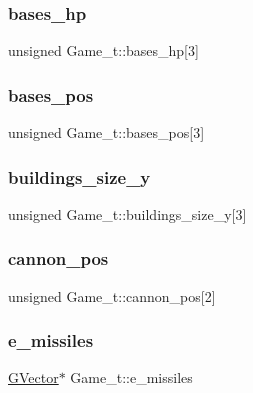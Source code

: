 \subsubsection{\texorpdfstring{bases\+\_\+hp}{bases\_hp}}
{\footnotesize\ttfamily unsigned Game\+\_\+t\+::bases\+\_\+hp\mbox{[}3\mbox{]}}

\hypertarget{struct_game__t_aa3465afd0a5082a9b40aec2f6643bf4a}{}\label{struct_game__t_aa3465afd0a5082a9b40aec2f6643bf4a} 
\subsubsection{\texorpdfstring{bases\+\_\+pos}{bases\_pos}}
{\footnotesize\ttfamily unsigned Game\+\_\+t\+::bases\+\_\+pos\mbox{[}3\mbox{]}}

\hypertarget{struct_game__t_a9cc316346c6e425c84857c694adaedb2}{}\label{struct_game__t_a9cc316346c6e425c84857c694adaedb2} 
\subsubsection{\texorpdfstring{buildings\+\_\+size\+\_\+y}{buildings\_size\_y}}
{\footnotesize\ttfamily unsigned Game\+\_\+t\+::buildings\+\_\+size\+\_\+y\mbox{[}3\mbox{]}}

\hypertarget{struct_game__t_a3d8925453d2141ee634a3bb32e7fc4bf}{}\label{struct_game__t_a3d8925453d2141ee634a3bb32e7fc4bf} 
\subsubsection{\texorpdfstring{cannon\+\_\+pos}{cannon\_pos}}
{\footnotesize\ttfamily unsigned Game\+\_\+t\+::cannon\+\_\+pos\mbox{[}2\mbox{]}}

\hypertarget{struct_game__t_a30c32876ba91964b9b7083ef244815e9}{}\label{struct_game__t_a30c32876ba91964b9b7083ef244815e9} 
\subsubsection{\texorpdfstring{e\+\_\+missiles}{e\_missiles}}
{\footnotesize\ttfamily \hyperlink{group___g_vector_ga6d90d5e6b721779a43354f2752b79281}{G\+Vector}$\ast$ Game\+\_\+t\+::e\+\_\+missiles}

